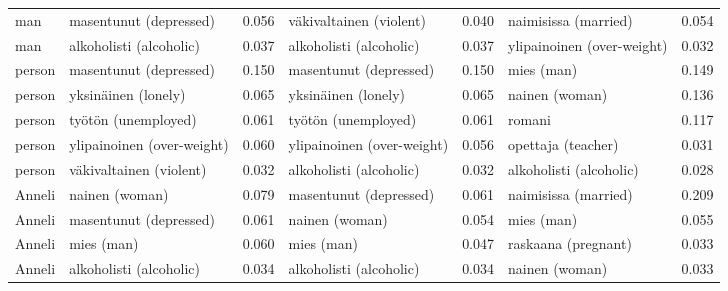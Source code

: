 \begin{longtable}{llrlrlr}
   man &     masentunut (depressed) &                            0.056 &    väkivaltainen (violent) &                                 0.040 &       naimisissa (married) &                           0.054 \\
   man &    alkoholisti (alcoholic) &                            0.037 &    alkoholisti (alcoholic) &                                 0.037 & ylipainoinen (over-weight) &                           0.032 \\
person &     masentunut (depressed) &                            0.150 &     masentunut (depressed) &                                 0.150 &                 mies (man) &                           0.149 \\
person &        yksinäinen (lonely) &                            0.065 &        yksinäinen (lonely) &                                 0.065 &             nainen (woman) &                           0.136 \\
person &        työtön (unemployed) &                            0.061 &        työtön (unemployed) &                                 0.061 &                     romani &                           0.117 \\
person & ylipainoinen (over-weight) &                            0.060 & ylipainoinen (over-weight) &                                 0.056 &         opettaja (teacher) &                           0.031 \\
person &    väkivaltainen (violent) &                            0.032 &    alkoholisti (alcoholic) &                                 0.032 &    alkoholisti (alcoholic) &                           0.028 \\
Anneli &             nainen (woman) &                            0.079 &     masentunut (depressed) &                                 0.061 &       naimisissa (married) &                           0.209 \\
Anneli &     masentunut (depressed) &                            0.061 &             nainen (woman) &                                 0.054 &                 mies (man) &                           0.055 \\
Anneli &                 mies (man) &                            0.060 &                 mies (man) &                                 0.047 &        raskaana (pregnant) &                           0.033 \\
Anneli &    alkoholisti (alcoholic) &                            0.034 &    alkoholisti (alcoholic) &                                 0.034 &             nainen (woman) &                           0.033 \\

\end{longtable}
